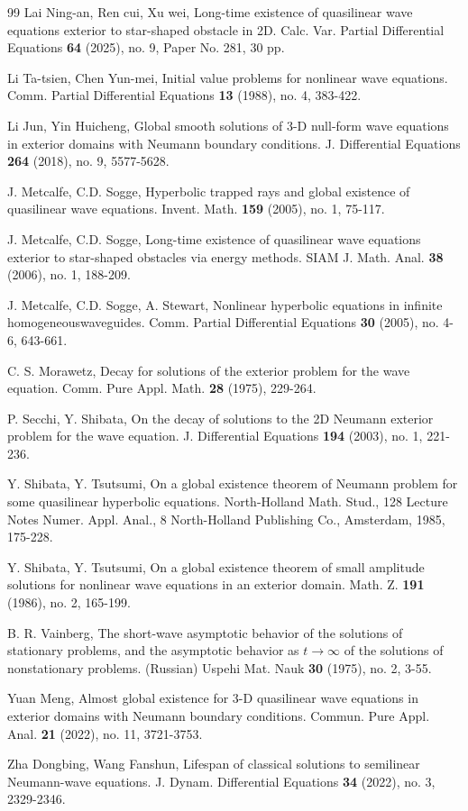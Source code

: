 \documentclass[11pt,twoside]{article}
\theoremstyle{plain}
\theoremstyle{definition}
\numberwithin{equation}{section}
\begin{document}
\begin{thebibliography}{99}
Lai Ning-an, Ren cui, Xu wei, Long-time existence of quasilinear wave equations exterior to star-shaped obstacle in 2D.
Calc. Var. Partial Differential Equations \textbf{64} (2025), no. 9, Paper No. 281, 30 pp.

Li Ta-tsien,  Chen Yun-mei, Initial value problems for nonlinear wave equations.
Comm. Partial Differential Equations \textbf{13} (1988), no. 4, 383-422.

Li Jun,  Yin Huicheng, Global smooth solutions of 3-D null-form wave equations in exterior domains with Neumann boundary conditions.
J. Differential Equations \textbf{264} (2018), no. 9, 5577-5628.


J. Metcalfe, C.D. Sogge, Hyperbolic trapped rays and global existence of quasilinear wave equations.
Invent. Math. \textbf{159} (2005), no. 1, 75-117.

J. Metcalfe, C.D. Sogge, Long-time existence of quasilinear wave equations exterior to star-shaped obstacles via energy methods.
SIAM J. Math. Anal. \textbf{38} (2006), no. 1, 188-209.


J. Metcalfe, C.D. Sogge, A. Stewart, Nonlinear hyperbolic equations in infinite homogeneouswaveguides.
Comm. Partial Differential Equations \textbf{30}  (2005),  no. 4-6, 643-661.

C. S. Morawetz, Decay for solutions of the exterior problem for the wave equation.
Comm. Pure Appl. Math. \textbf{28} (1975), 229-264.


P. Secchi, Y. Shibata, On the decay of solutions to the 2D Neumann exterior problem for the wave equation.
J. Differential Equations \textbf{194} (2003), no. 1, 221-236.

Y. Shibata, Y. Tsutsumi, On a global existence theorem of Neumann problem for some quasilinear hyperbolic equations.
North-Holland Math. Stud., 128 Lecture Notes Numer. Appl. Anal., 8 North-Holland Publishing Co., Amsterdam, 1985, 175-228.

Y. Shibata, Y. Tsutsumi, On a global existence theorem of small amplitude solutions for nonlinear wave equations in an exterior domain.
Math. Z. \textbf{191} (1986), no. 2, 165-199.

B. R. Vainberg, The short-wave asymptotic behavior of the solutions of stationary problems, and the asymptotic behavior as $t\rightarrow\infty$ of the solutions of nonstationary problems. (Russian) Uspehi Mat. Nauk \textbf{30} (1975), no. 2, 3-55.


Yuan Meng, Almost global existence for 3-D quasilinear wave equations in exterior domains with Neumann boundary conditions.
Commun. Pure Appl. Anal. \textbf{21} (2022), no. 11, 3721-3753.

Zha Dongbing, Wang Fanshun,
Lifespan of classical solutions to semilinear Neumann-wave equations.
J. Dynam. Differential Equations \textbf{34} (2022), no. 3, 2329-2346.


\end{thebibliography}
\end{document}
